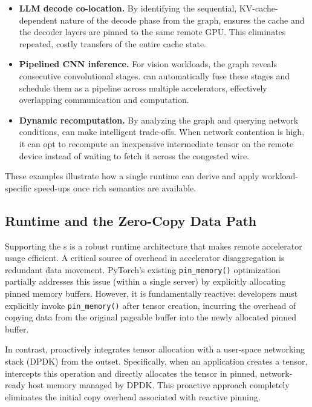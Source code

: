 \begin{itemize}[left=0pt]
    \item \textbf{LLM decode co-location.} By identifying the sequential, KV-cache-dependent nature of the decode phase from the graph, \sys{} ensures the cache and the decoder layers are pinned to the same remote GPU. This eliminates repeated, costly transfers of the entire cache state.
    \item \textbf{Pipelined CNN inference.} For vision workloads, the graph reveals consecutive convolutional stages. \sys{} can automatically fuse these stages and schedule them as a pipeline across multiple accelerators, effectively overlapping communication and computation.
    \item \textbf{Dynamic recomputation.} By analyzing the graph and querying network conditions, \sys{} can make intelligent trade-offs. When network contention is high, it can opt to recompute an inexpensive intermediate tensor on the remote device instead of waiting to fetch it across the congested wire.
\end{itemize}

These examples illustrate how a single runtime can derive and apply workload-specific speed-ups once rich semantics are available.

\subsection{Runtime and the Zero-Copy Data Path}
\label{ssec:zerocopy}

Supporting the \lazytensor{}s is a robust runtime architecture that makes remote accelerator usage efficient. A critical source of overhead in accelerator disaggregation is redundant data movement. 
PyTorch's existing \texttt{pin\_memory()} optimization partially addresses this issue (within a single server) by explicitly allocating pinned memory buffers.
However, it is fundamentally reactive: developers must explicitly invoke \texttt{pin\_memory()} after tensor creation, incurring the overhead of copying data from the original pageable buffer into the newly allocated pinned buffer.


In contrast, \sys proactively integrates tensor allocation with a user-space networking stack (DPDK) from the outset. 
Specifically, when an application creates a tensor, \sys intercepts this operation and directly allocates the tensor in pinned, network-ready host memory managed by DPDK. 
This proactive approach completely eliminates the initial copy overhead associated with reactive pinning.

